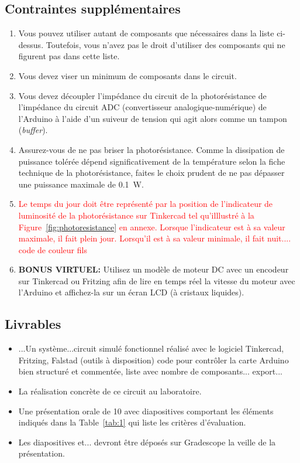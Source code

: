 \documentclass[english,french,12pt]{article}
\begin{document}
\subsection*{Contraintes supplémentaires}
\begin{enumerate}
    \item Vous pouvez utiliser autant de composants que nécessaires dans la liste ci-dessus. Toutefois, vous n’avez pas le droit d’utiliser des composants qui ne figurent pas dans cette liste.
    \item Vous devez viser un minimum de composants dans le circuit. %
    \item Vous devez découpler l’impédance du circuit de la photorésistance de l’impédance du circuit ADC (convertisseur analogique-numérique) de l’Arduino à l'aide d'un suiveur de tension qui agit alors comme un tampon (\textit{buffer}).
    \item Assurez-vous de ne pas briser la photorésistance. Comme la dissipation de puissance tolérée dépend significativement de la température selon la fiche technique de la photorésistance, faites le choix prudent de ne pas dépasser une puissance maximale de \SI{0.1}{W}. 
    \item \textcolor{red}{Le temps du jour doit être représenté par la position de l’indicateur de luminosité de la photorésistance sur Tinkercad tel qu'illlustré à la Figure~\ref{fig:photoresistance} en annexe. Lorsque l’indicateur est à sa valeur maximale, il fait plein jour. Lorsqu’il est à sa valeur minimale, il fait nuit.... code de couleur fils}
    \item \textbf{BONUS VIRTUEL:} Utilisez un modèle de moteur DC avec un encodeur sur Tinkercad ou Fritzing afin de lire en temps réel la vitesse du moteur avec l’Arduino et affichez-la sur un écran LCD (à cristaux liquides).%
\end{enumerate}
\vspace{-1em}

\subsection*{Livrables}
\label{subsec:livrables}
\begin{itemize}
    \item ...Un système...circuit simulé fonctionnel réalisé avec le logiciel Tinkercad, Fritzing, Falstad (outils à disposition) code pour contrôler la carte Arduino bien structuré et commentée, liste avec nombre de composants... export...
    \item La réalisation concrète de ce circuit au laboratoire.
    \item Une présentation orale de \SI{10}{\min} avec diapositives comportant les éléments indiqués dans la Table~\ref{tab:1} qui liste les critères d'évaluation.
    \item Les diapositives et... devront être déposés sur Gradescope la veille de la présentation.
\end{itemize}
\vspace{-1em}
\end{document}
